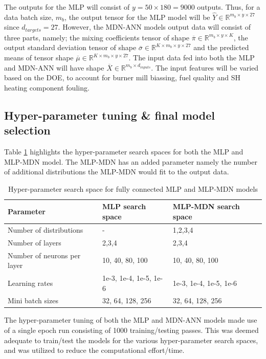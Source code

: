 \documentclass[a4paper,fleqn]{cas-sc}
\begin{document}
The outputs for the MLP will consist of $y=50\times180=9000$ outputs. Thus, for a data batch size, $m_b$, the output tensor for the MLP model will be $\hat{Y}\in \mathbb{R}^{m_b\times y\times 27}$ since $d_{targets}=27$. However, the MDN-ANN models output data will consist of three parts, namely; the mixing coefficients tensor of shape  $\overline{\pi}\in \mathbb{R}^{m_b \times y\times K}$, the output standard deviation tensor of shape $\overline{\sigma}\in \mathbb{R}^{K\times m_b\times y\times 27}$ and the predicted means of tensor shape $\overline{\mu}\in \mathbb{R}^{K\times m_b\times y\times 27}$. The input data fed into both the MLP and MDN-ANN will have shape $\overline{X}\in \mathbb{R}^{m_b\times d_{inputs}}$. The input features will be varied based on the DOE, to account for burner mill biassing, fuel quality and SH heating component fouling.\\
\subsection{Hyper-parameter tuning \& final model selection}\label{sec_hyper}
Table \ref{tbl_tuning} highlights the hyper-parameter search spaces for both the MLP and MLP-MDN model. The MLP-MDN has an added parameter namely the number of additional distributions the MLP-MDN would fit to the output data. \\

\begin{table}[h!]
\caption{Hyper-parameter search space for fully connected MLP and MLP-MDN models}\label{tbl_tuning}
\begin{tabular*}{\textwidth}{p{}p{}p{}}
\toprule
 Parameter& MLP search space & MLP-MDN search space \\ %
\midrule
 Number of distributions & - & 1,2,3,4  \\
 Number of layers & 2,3,4 & 2,3,4\\
 Number of neurons per layer & 10, 40, 80, 100  & 10, 40, 80, 100\\
 Learning rates & 1e-3, 1e-4, 1e-5, 1e-6 &  1e-3, 1e-4, 1e-5, 1e-6   \\
 Mini batch sizes  &32, 64, 128, 256 &32, 64, 128, 256  \\
\bottomrule
\end{tabular*}
\end{table}

The hyper-parameter tuning of both the MLP and MDN-ANN models made use of a single epoch run consisting of 1000 training/testing passes. This was deemed adequate to train/test the models for the various hyper-parameter search spaces, and was utilized to reduce the computational effort/time.\\
\end{document}

